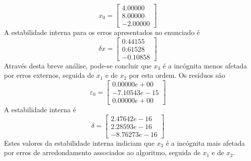 \setcounter{chapter}{0}
{
\renewcommand{\thesubsection}{\thesection\alph{subsection}}
%
\begin{equation*}
	x_0 = \begin{bmatrix}
		4.00000 \\
		8.00000 \\
		-2.00000
	\end{bmatrix}
\end{equation*}
A estabilidade interna para os erros apresentados no enunciado é
\begin{equation*}
	\delta x = \begin{bmatrix}
		0.44155 \\
		0.61528 \\
		-0.10858
	\end{bmatrix}
\end{equation*}
Através desta breve análise, pode-se concluir que $x_3$ é a incógnita menos afetada por erros externos, seguida de $x_1$ e de $x_2$ por esta ordem.
Os resíduos são
\begin{equation*}
	\varepsilon _0 = \begin{bmatrix}
		0.00000e+00 \\
		-7.10543e-15 \\
		0.00000e+00
	\end{bmatrix}
\end{equation*}
A estabilidade interna é
\begin{equation*}
	\delta = \begin{bmatrix}
		2.47642e-16 \\
		2.28593e-16 \\
		-8.76273e-16
	\end{bmatrix}
\end{equation*}
Estes valores da estabilidade interna indiciam que $x_3$ é a incógnita mais afetada por erros de arredondamento associados ao algoritmo, seguida de $x_1$ e de $x_2$.
}
